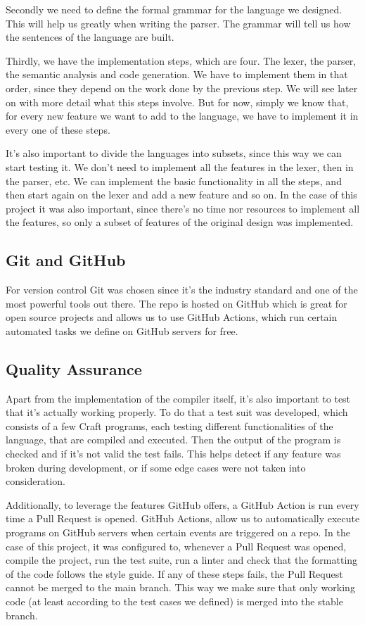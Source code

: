 ﻿\documentclass[10pt,a4paper,twocolumn,twoside]{article}
\begin{document}
Secondly we need to define the formal grammar for the language we designed. This
will help us greatly when writing the parser. The grammar will tell us how the
sentences of the language are built.

Thirdly, we have the implementation steps, which are four. The lexer, the
parser, the semantic analysis and code generation. We have to implement them in
that order, since they depend on the work done by the previous step.  We will
see later on with more detail what this steps involve. But for now, simply we
know that, for every new feature we want to add to the language, we have to
implement it in every one of these steps.

It's also important to divide the languages into subsets, since this way we 
can start testing it. We don't need to implement all the features in the lexer,
then in the parser, etc. We can implement the basic functionality in all the 
steps, and then start again on the lexer and add a new feature and so on. In the
case of this project it was also important, since there's no time nor resources
to implement all the features, so only a subset of features of the original 
design was implemented.

\subsection{Git and GitHub}
For version control Git was chosen since it's the industry standard and one of
the most powerful tools out there. The repo is hosted on GitHub \cite{repo}
which is great for open source projects and allows us to use GitHub Actions,
which run certain automated tasks we define on GitHub servers for free.

\subsection{Quality Assurance}
Apart from the implementation of the compiler itself, it's also important to 
test that it's actually working properly. To do that a test suit was developed,
which consists of a few Craft programs, each testing different functionalities 
of the language, that are compiled and executed. Then the output of the program 
is checked and if it's not valid the test fails. This helps detect if any 
feature was broken during development, or if some edge cases were not taken into
consideration.

Additionally, to leverage the features GitHub offers, a GitHub Action is run
every time a Pull Request is opened. GitHub Actions, allow us to automatically
execute programs on GitHub servers when certain events are triggered on a repo.
In the case of this project, it was configured to, whenever a Pull Request was
opened, compile the project, run the test suite, run a linter and check that the
formatting of the code follows the style guide. If any of these steps fails, the
Pull Request cannot be merged to the main branch. This way we make sure that
only working code (at least according to the test cases we defined) is merged
into the stable branch.
\end{document}
